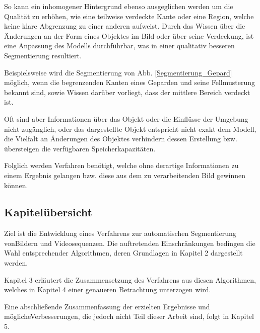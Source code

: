\noindent So kann ein inhomogener Hintergrund ebenso ausgeglichen werden um die Qualität zu erhöhen, wie eine teilweise verdeckte Kante oder eine Region, welche keine klare Abgrenzung zu einer anderen aufweist.
Durch das Wissen über die Änderungen an der Form eines Objektes im Bild oder über seine Verdeckung, ist eine Anpassung des Modells durchführbar, was in einer qualitativ besseren Segmentierung resultiert.

Beispielsweise wird die Segmentierung von Abb. \ref{Segmentierung_Gepard} möglich, wenn die begrenzenden Kanten eines Geparden und seine Fellmusterung bekannt sind, sowie Wissen darüber vorliegt, dass der mittlere Bereich verdeckt ist.

Oft sind aber Informationen über das Objekt oder die Einflüsse der Umgebung nicht zugänglich, oder das dargestellte Objekt entspricht nicht exakt dem Modell, die Vielfalt an Änderungen des Objektes verhindern dessen Erstellung bzw. übersteigen die verfügbaren Speicherkapazitäten.

Folglich werden Verfahren benötigt, welche ohne derartige Informationen zu einem Ergebnis gelangen bzw. diese aus dem zu verarbeitenden Bild gewinnen können.

\subsection{Kapitelübersicht}
Ziel ist die Entwicklung eines Verfahrens zur automatischen Segmentierung von\linebreak Bildern und Videosequenzen. Die auftretenden Einschränkungen bedingen die Wahl entsprechender Algorithmen, deren Grundlagen in Kapitel 2 dargestellt werden.

Kapitel 3 erläutert die Zusammensetzung des Verfahrens aus diesen Algorithmen, welches in Kapitel 4 einer genaueren Betrachtung unterzogen wird.

Eine abschließende Zusammenfassung der erzielten Ergebnisse und mögliche\linebreak Verbesserungen, die jedoch nicht Teil dieser Arbeit sind, folgt in Kapitel 5.

